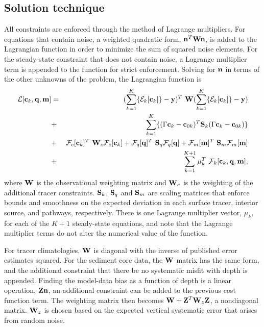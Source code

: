 \documentclass[agums]{aguplus}  %
\begin{document}
\subsection{Solution technique}
\label{sec:solution}

All constraints are enforced through the method of Lagrange
multipliers.  For equations that contain noise, a weighted quadratic
form, ${\bf n}^T {\bf W} {\bf n}$, is added to the Lagrangian function
in order to minimize the sum of squared noise elements.  For the
steady-state constraint that does not contain noise, a Lagrange
multiplier term is appended to the function for strict
enforcement. Solving for ${\bf n}$ in terms of the other unknowns of
the problem, the Lagrangian function is
\begin{eqnarray}
\label{eq:lagrangian}
   {\cal L} [{\bf c}_k,{\bf q},{\bf m}] &=&  (\sum^K_{k=1} \{ {\cal
     E}_k [{\bf c}_k] \} - {\bf
  y})^T ~{\bf W} ( \sum^K_{k=1} \{ {\cal E}_k [{\bf c}_k] \} - {\bf y}) \\
&+&  \sum^K_{k=1} \{ (\Gamma {\bf c}_k - {\bf c}_{0k})^T {\bf
   S}_k   (\Gamma {\bf c}_k - {\bf c}_{0k}) \}\\
& +&  {\cal F}_c [{\bf c}_k]^T ~{\bf W}_c  {\cal
   F}_c[ {\bf c}_k]  
 +  {\cal F}_q[{\bf q}]^T ~{\bf S}_q  {\cal F}_q
 [{\bf q}] +  {\cal F}_m [{\bf m}]^T ~{\bf S}_m {\cal
   F}_m [{\bf m}] \\ 
&+&\sum^{K+1}_{k=1}  \mu_k^T ~{\cal F}_k [{\bf c}_k,{\bf q},{\bf m}],
\label{eq:lagrangian2}
\end{eqnarray}
where ${\bf W}$ is the observational weighting matrix and ${\bf W}_c$
is the weighting of the additional tracer constraints. ${\bf S}_k$,
${\bf S}_q$ and ${\bf S}_m$ are scaling matrices that enforce bounds
and smoothness on the expected deviation in each surface tracer,
interior source, and pathways, respectively.  There is one Lagrange
multiplier vector, $\mu_k$, for each of the $K+1$ steady-state
equations, and note that the Lagrange multiplier terms do not alter
the numerical value of the function.

For tracer climatologies, ${\bf W}$ is diagonal with the inverse of
published error estimates squared. For the sediment core data, the
${\bf W}$ matrix has the same form, and the additional constraint that
there be no systematic misfit with depth is appended. Finding the
model-data bias as a function of depth is a linear operation,
${\bf Z}{\bf n}$, an additional constraint can be added to the
previous cost function term. The weighting matrix then becomes
${\bf W} + {\bf Z}^T {\bf W}_z {\bf Z}$, a nondiagonal matrix.
${\bf W}_z$ is chosen based on the expected vertical systematic error
that arises from random noise.
\end{document}
